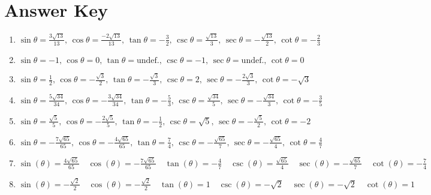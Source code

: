 \newpage

\section{Answer Key}

\begin{enumerate}
	\item $\sin\theta = \frac{3\sqrt{13}}{13}, \, \cos\theta = \frac{-2\sqrt{13}}{13}, \, \tan\theta = -\frac{3}{2}, \, \csc\theta = \frac{\sqrt{13}}{3}, \, \sec\theta = -\frac{\sqrt{13}}{2}, \, \cot\theta = -\frac{2}{3}$

    \item $\sin\theta = -1, \, \cos\theta = 0, \, \tan\theta = \text{undef.}, \, \csc\theta = -1, \, \sec\theta = \text{undef.}, \, \cot\theta = 0$
    
    \item $\sin\theta = \frac{1}{2}, \, \cos\theta = -\frac{\sqrt{3}}{2}, \, \tan\theta = -\frac{\sqrt{3}}{3}, \, \csc\theta = 2, \, \sec\theta = -\frac{2\sqrt{3}}{3}, \, \cot\theta = -\sqrt{3}$
    
    \item $\sin \theta = \frac{5\sqrt{34}}{34}, \, \cos\theta = -\frac{3\sqrt{34}}{34}, \, \tan\theta = -\frac{5}{3}, \, \csc\theta = \frac{\sqrt{34}}{5}, \, \sec\theta = -\frac{\sqrt{34}}{3}, \, \cot\theta=-\frac{3}{5}$
    
     \item $\sin \theta = \frac{\sqrt{5}}{5}, \, \cos\theta = -\frac{2\sqrt{5}}{5}, \, \tan\theta = -\frac{1}{2}, \, \csc\theta = \sqrt{5}, \, \sec\theta = -\frac{\sqrt{5}}{2}, \, \cot\theta=-2$
    
     \item $\sin \theta = -\frac{7\sqrt{65}}{65}, \, \cos\theta = -\frac{4\sqrt{65}}{65}, \, \tan\theta = \frac{7}{4}, \, \csc\theta = -\frac{\sqrt{65}}{7}, \, \sec\theta = -\frac{\sqrt{65}}{4}, \, \cot\theta= \frac{4}{7}$
     
     \item $\sin(\theta) = \frac{4\sqrt{65}}{65} \quad \cos(\theta) = -\frac{7\sqrt{65}}{65} \quad \tan(\theta) = -\frac{4}{7} \quad \csc(\theta) = \frac{\sqrt{65}}{4} \quad \sec(\theta) = -\frac{\sqrt{65}}{7} \quad \cot(\theta) = -\frac{7}{4}$
    
    \item $\sin(\theta) = -\frac{\sqrt{2}}{2} \quad  \cos(\theta) = -\frac{\sqrt{2}}{2} \quad \tan(\theta) = 1 \quad \csc(\theta) = -\sqrt{2} \quad \sec(\theta) = -\sqrt{2} \quad \cot(\theta) = 1$
    

\end{enumerate}
